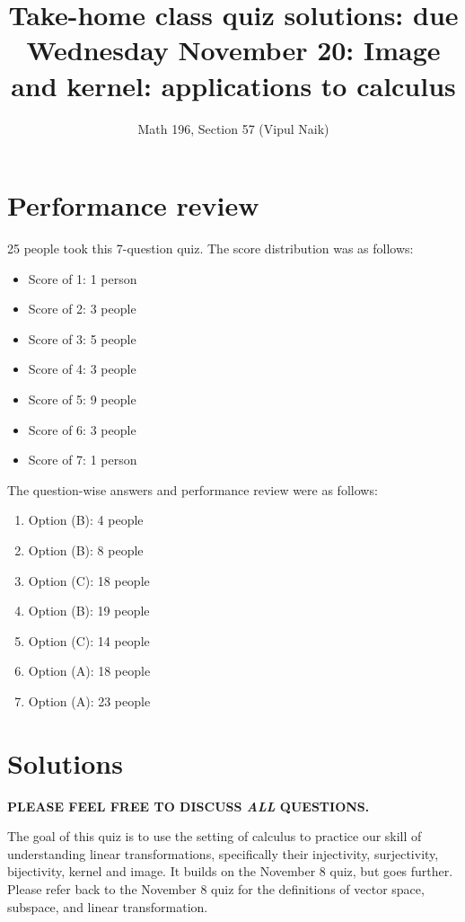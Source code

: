 \documentclass[10pt]{amsart}
\title{Take-home class quiz solutions: due Wednesday November 20: Image and kernel: applications to calculus}
\author{Math 196, Section 57 (Vipul Naik)}
\begin{document}
\maketitle

\section{Performance review}

25 people took this 7-question quiz. The score distribution was as follows:

\begin{itemize}
\item Score of 1: 1 person
\item Score of 2: 3 people
\item Score of 3: 5 people
\item Score of 4: 3 people
\item Score of 5: 9 people
\item Score of 6: 3 people
\item Score of 7: 1 person
\end{itemize}

The question-wise answers and performance review were as follows:

\begin{enumerate}
\item Option (B): 4 people %
\item Option (B): 8 people %
\item Option (C): 18 people %
\item Option (B): 19 people %
\item Option (C): 14 people %
\item Option (A): 18 people %
\item Option (A): 23 people
\end{enumerate}

\section{Solutions}

{\bf PLEASE FEEL FREE TO DISCUSS {\em ALL} QUESTIONS.}

The goal of this quiz is to use the setting of calculus to practice
our skill of understanding linear transformations, specifically their
injectivity, surjectivity, bijectivity, kernel and image. It builds on
the November 8 quiz, but goes further. Please refer back to the
November 8 quiz for the definitions of vector space, subspace, and
linear transformation.
\end{document}
